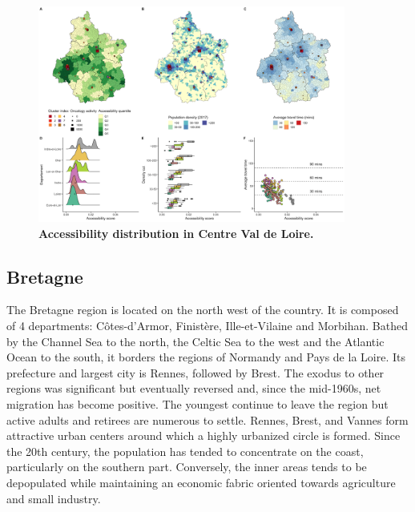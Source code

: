 \begin{figure}[H]
    \includegraphics[width=0.9\textwidth]{images/camion/region_accessibility/accessibility_Centre-Val-de-Loire.png}
    \centering
    \caption{
        \textbf{Accessibility distribution in Centre Val de Loire.}
    }
\end{figure}

\subsection*{Bretagne}

The Bretagne region is located on the north west of the country. It is composed
of 4 departments: Côtes-d'Armor, Finistère, Ille-et-Vilaine and Morbihan. Bathed
by the Channel Sea to the north, the Celtic Sea to the west and the Atlantic
Ocean to the south, it borders the regions of Normandy and Pays de la Loire. Its
prefecture and largest city is Rennes, followed by Brest. The exodus to other
regions was significant but eventually reversed and, since the mid-1960s, net
migration has become positive. The youngest continue to leave the region but
active adults and retirees are numerous to settle. Rennes, Brest, and Vannes
form attractive urban centers around which a highly urbanized circle is formed.
Since the 20th century, the population has tended to concentrate on the coast,
particularly on the southern part. Conversely, the inner areas tends to be
depopulated while maintaining an economic fabric oriented towards agriculture
and small industry.

